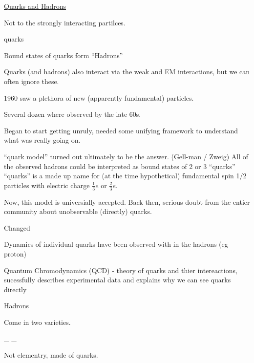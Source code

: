 {\fontsize{14}{16}\selectfont

\underline{Quarks and Hadrons}

Not to the strongly interacting partilces. 

\begin{center}
quarks 
\end{center}

Bound states of quarks form ``Hadrons''

Quarks (and hadrons) also interact via the weak and EM interactions, but we can often ignore these. 

1960 saw a plethora of new (apparently fundamental) particles. 

Several dozen where observed by the late 60s. 

Began to start getting unruly, needed some unifying framework to understand what was really going on. 

\underline{``quark model''} turned out ultimately to be the answer. (Gell-man / Zweig) 
All of the observed hadrons could be interpreted as bound states of 2 or 3 ``quarks''
``quarks'' is a made up name for (at the time hypothetical) fundamental spin 1/2 particles with electric charge $\frac{1}{3} e$ or $\frac{2}{3} e$.

Now, this model is universially accepted. 
Back then, serious doubt from the entier community about unobservable (directly) quarks. 
 
Changed
\bi
\item[-] Dynamics of individual quarks have been observed with in the hadrons (eg proton) 
\item[-] Quantum Chromodynamics (QCD) - theory of quarks and thier intereactions, sucessfully describes experimental data and explains why we can see quarks directly
\ei

\clearpage

\underline{Hadrons}

Come in two varieties.

\be
{}_{} \hspace*{1in} _{} 
\ee

Not elementry, made of quarks. 

}
